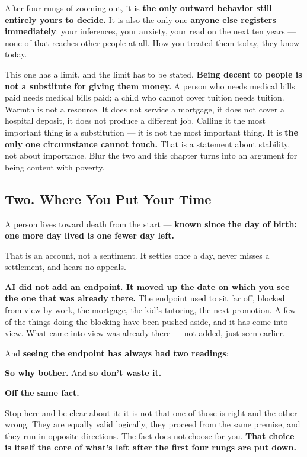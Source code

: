 \documentclass[11pt,a4paper]{article}
\begin{document}
After four rungs of zooming out, it is \textbf{the only outward behavior still entirely yours to decide.} It is also the only one \textbf{anyone else registers immediately}: your inferences, your anxiety, your read on the next ten years --- none of that reaches other people at all. How you treated them today, they know today.

This one has a limit, and the limit has to be stated. \textbf{Being decent to people is not a substitute for giving them money.} A person who needs medical bills paid needs medical bills paid; a child who cannot cover tuition needs tuition. Warmth is not a resource. It does not service a mortgage, it does not cover a hospital deposit, it does not produce a different job. Calling it the most important thing is a substitution --- it is not the most important thing. It is \textbf{the only one circumstance cannot touch.} That is a statement about stability, not about importance. Blur the two and this chapter turns into an argument for being content with poverty.

\subsection{Two. Where You Put Your Time}

A person lives toward death from the start --- \textbf{known since the day of birth: one more day lived is one fewer day left.}

That is an account, not a sentiment. It settles once a day, never misses a settlement, and hears no appeals.

\textbf{AI did not add an endpoint. It moved up the date on which you see the one that was already there.} The endpoint used to sit far off, blocked from view by work, the mortgage, the kid's tutoring, the next promotion. A few of the things doing the blocking have been pushed aside, and it has come into view. What came into view was already there --- not added, just seen earlier.

And \textbf{seeing the endpoint has always had two readings}:

\textbf{So why bother.} And \textbf{so don't waste it.}

\textbf{Off the same fact.}

Stop here and be clear about it: it is not that one of those is right and the other wrong. They are equally valid logically, they proceed from the same premise, and they run in opposite directions. The fact does not choose for you. \textbf{That choice is itself the core of what's left after the first four rungs are put down.}
\end{document}
